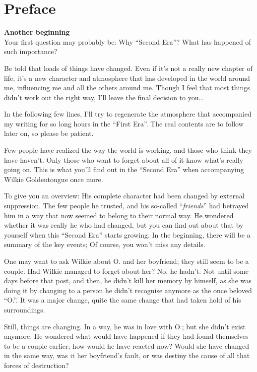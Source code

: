 \mainmatter
\chapter{Preface}
\label{cha:preface}
\textbf{Another beginning}\\
Your first question may probably be: Why \enquote{Second Era}? What has happened of such importance?

Be told that loads of things have changed. Even if it's not a really new chapter of life, it's a new character and atmosphere that has developed in the world around me, influencing me and all the others around me. Though I feel that most things didn't work out the right way, I'll leave the final decision to you\ldots

In the following few lines, I'll try to regenerate the atmosphere that accompanied my writing for so long hours in the \enquote{First Era}. The real contents are to follow later on, so please be patient.

Few people have realized the way the world is working, and those who think they have haven't. Only those who want to forget about all of it know what's really going on. This is what you'll find out in the \enquote{Second Era} when accompanying Wilkie Goldentongue once more.

To give you an overview: His complete character had been changed by external suppression. The few people he trusted, and his so-called \enquote{\emph{friends}} had betrayed him in a way that now seemed to belong to their normal way. He wondered whether it was really he who had changed, but you can find out about that by yourself when this \enquote{Second Era} starts growing. In the beginning, there will be a summary of the key events; Of course, you won't miss any details.

One may want to ask Wilkie about O. and her boyfriend; they still seem to be a couple. Had Wilkie managed to forget about her? No, he hadn't. Not until some days before that post, and then, he didn't kill her memory by himself, as she was doing it by changing to a person he didn't recognise anymore as the once beloved \enquote{O.}. It was a major change, quite the same change that had taken hold of his surroundings.

Still, things are changing. In a way, he was in love with O.; but she didn't exist anymore. He wondered what would have happened if they had found themselves to be a couple earlier; how would he have reacted now? Would she have changed in the same way, was it her boyfriend's fault, or was destiny the cause of all that forces of destruction?

